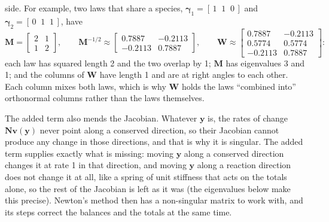 \documentclass[11pt,a4paper,openany]{report}
\begin{document}
{{side. For example, two laws that share a species, $\boldsymbol{\gamma}_1 =
[\,1 \;\; 1 \;\; 0\,]$ and $\boldsymbol{\gamma}_2 = [\,0 \;\; 1 \;\; 1\,]$,
have
\[
  \mathbf{M} = \begin{bmatrix} 2 & 1 \\ 1 & 2 \end{bmatrix} ,
  \qquad
  \mathbf{M}^{-1/2} \approx \begin{bmatrix} 0.7887 & -0.2113 \\
    -0.2113 & 0.7887 \end{bmatrix} ,
  \qquad
  \mathbf{W} \approx \begin{bmatrix} 0.7887 & -0.2113 \\ 0.5774 & 0.5774 \\
    -0.2113 & 0.7887 \end{bmatrix} :
\]
each law has squared length 2 and the two overlap by 1; $\mathbf{M}$ has
eigenvalues 3 and 1; and the columns of $\mathbf{W}$ have length 1 and are
at right angles to each other. Each column mixes both laws, which is why
$\mathbf{W}$ holds the laws ``combined into'' orthonormal columns rather than
the laws themselves.

The added term also mends the Jacobian. Whatever $\mathbf{y}$ is, the rates of
change $\mathbf{N} \mathbf{v}(\mathbf{y})$ never point along a conserved direction, so their
Jacobian cannot produce any change in those directions, and that is why it
is singular. The added term supplies exactly what is missing: moving $\mathbf{y}$
along a conserved direction changes it at rate 1 in that direction, and
moving $\mathbf{y}$ along a reaction direction does not change it at all, like
a spring of unit stiffness that acts on the totals alone, so the
rest of the Jacobian is left as it was (the eigenvalues below make this
precise). Newton's method then has a non-singular matrix to work with, and
its steps correct the balances and the totals at the same time.

}}
\end{document}
